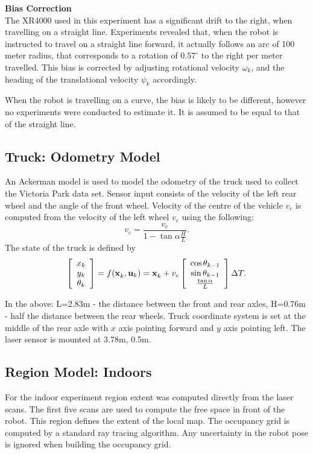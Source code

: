 {\bf Bias Correction}\\ The XR4000 used in this experiment has a
significant drift to the right, when travelling on a straight
line. Experiments revealed that, when the robot is instructed to travel
on a straight line forward, it actually follows an arc of 100 meter
radius, that corresponds to a rotation of $0.57^\circ$ to the right per
meter travelled. This bias is corrected by adjusting rotational velocity
$\omega_k$, and the heading of the translational velocity $\psi_k$
accordingly.

When the robot is travelling on a curve, the bias is likely to be
different, however no experiments were conducted to estimate it. It is
assumed to be equal to that of the straight line.


\subsection{Truck: Odometry Model}

An Ackerman model is used to model the odometry of the truck used to
collect the Victoria Park data set. Sensor input consists of the
velocity of the left rear wheel and the angle of the front
wheel. Velocity of the centre of the vehicle $v_c$ is computed from the
velocity of the left wheel $v_e$ using the following:
$$
v_c = \frac{v_e}{1 - \tan \alpha \frac{H}{L}}.
$$
The state of the truck is defined by
$$
\Vector{x_k\\y_k\\\theta_k} = f(\x{k}{}{},\U{k}) = 
\x{k}{}{} + v_c \Vector{\cos \theta_{k-1} \\ \sin
  \theta_{k-1} \\ \frac{\tan \alpha}{L}} \Delta T.
$$

In the above: L=2.83m - the distance between the front and rear axles,
H=0.76m - half the distance between the rear wheels. Truck coordinate
system is set at the middle of the rear axle with $x$ axis pointing
forward and $y$ axis pointing left. The laser sensor is mounted at 3.78m,
0.5m.

\subsection{Region Model: Indoors}

For the indoor experiment region extent was computed directly from the
laser scans. The first five scans are used to compute the free space in
front of the robot. This region defines the extent of the local map.
The occupancy grid is computed by a standard ray tracing algorithm. Any
uncertainty in the robot pose is ignored when building the occupancy
grid.

